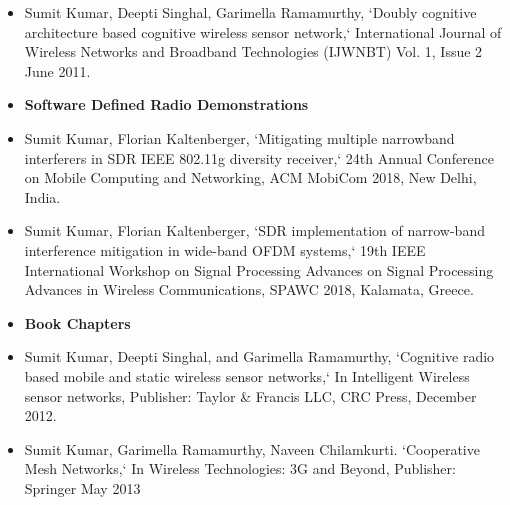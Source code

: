 \documentclass[res,10pt]{article}
\begin{document}
\begin{itemize}
\item \justifying Sumit Kumar,
Deepti Singhal, Garimella Ramamurthy, `Doubly cognitive architecture based cognitive wireless sensor network,`  International Journal of Wireless Networks and Broadband
Technologies (IJWNBT) Vol. 1, Issue 2 June 2011.
\item[] \centering \large \textbf{Software Defined Radio Demonstrations}
\item \justifying Sumit Kumar, Florian Kaltenberger, `Mitigating multiple narrowband interferers in SDR IEEE 802.11g diversity receiver,` 24th
Annual Conference on Mobile Computing and Networking, ACM MobiCom 2018, New Delhi, India.
\item \justifying Sumit Kumar, Florian Kaltenberger, `SDR implementation of narrow-band interference mitigation in wide-band OFDM systems,` 19th IEEE International Workshop on Signal Processing Advances on Signal Processing Advances
in Wireless Communications, SPAWC 2018, Kalamata, Greece.
\item[] \centering \large \textbf{Book Chapters}
\item \justifying Sumit Kumar, Deepti Singhal, and Garimella Ramamurthy, `Cognitive radio based mobile and static wireless sensor networks,` In Intelligent Wireless sensor networks, Publisher: Taylor \&
Francis LLC, CRC Press, December 2012.
\item \justifying Sumit Kumar, Garimella Ramamurthy, Naveen Chilamkurti. `Cooperative Mesh Networks,` In Wireless Technologies: 3G and Beyond, Publisher: Springer May 2013
\begin{comment}
\item \justifying
K. Sankhe, C. Pradhan, \underline{\textbf{S. Kumar}}, and G. Ramamurthy, ``Machine Learning Based Cooperative Relay Selection in Virtual MIMO'', \textbf{IEEE WTS'15}, New York, USA, Apr. 2015. \vspace{-8pt}
\item \justifying
C. Pradhan, K. Sankhe, \underline{\textbf{S. Kumar}}, and G. Ramamurthy, ``Revamp of eNodeB for 5G Networks: Detracting Spectrum Scarcity'', \textbf{IEEE CCNC'15}, Las Vegas, USA, Jan. 2015. \vspace{-8pt}
\end{comment}
\end{itemize}
\end{document}
